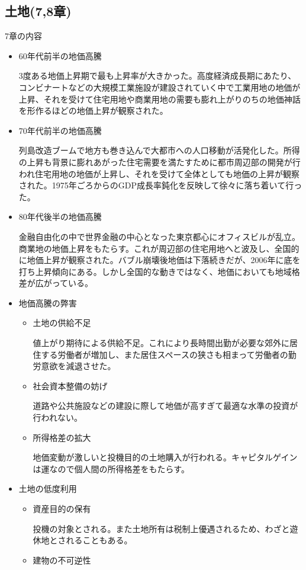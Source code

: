 \documentclass{jsarticle}
\begin{document}
\subsection{土地(7,8章)}
7章の内容
\begin{itemize}
\item 60年代前半の地価高騰

3度ある地価上昇期で最も上昇率が大きかった。高度経済成長期にあたり、コンビナートなどの大規模工業施設が建設されていく中で工業用地の地価が上昇、それを受けて住宅用地や商業用地の需要も膨れ上がりのちの地価神話を形作るほどの地価上昇が観察された。
\item 70年代前半の地価高騰

列島改造ブームで地方も巻き込んで大都市への人口移動が活発化した。所得の上昇も背景に膨れあがった住宅需要を満たすために都市周辺部の開発が行われ住宅用地の地価が上昇し、それを受けて全体としても地価の上昇が観察された。1975年ごろからのGDP成長率鈍化を反映して徐々に落ち着いて行った。
\item 80年代後半の地価高騰

金融自由化の中で世界金融の中心となった東京都心にオフィスビルが乱立。商業地の地価上昇をもたらす。これが周辺部の住宅用地へと波及し、全国的に地価上昇が観察された。バブル崩壊後地価は下落続きだが、2006年に底を打ち上昇傾向にある。しかし全国的な動きではなく、地価においても地域格差が広がっている。
\item 地価高騰の弊害
	\begin{itemize}
	\item 土地の供給不足
	
	値上がり期待による供給不足。これにより長時間出勤が必要な郊外に居住する労働者が増加し、また居住スペースの狭さも相まって労働者の勤労意欲を減退させた。
	\item 社会資本整備の妨げ
	
	道路や公共施設などの建設に際して地価が高すぎて最適な水準の投資が行われない。
	\item 所得格差の拡大
	
	地価変動が激しいと投機目的の土地購入が行われる。キャピタルゲインは運なので個人間の所得格差をもたらす。
	\end{itemize}
\item 土地の低度利用
	\begin{itemize}
	\item 資産目的の保有
	
	投機の対象とされる。また土地所有は税制上優遇されるため、わざと遊休地とされることもある。
	\item 建物の不可逆性
	

\end{itemize}
\end{itemize}
\end{document}
